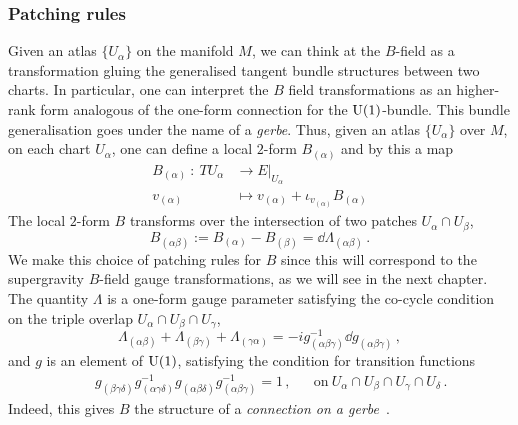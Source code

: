 \documentclass[debug]{phd}
\begin{document}
					\subsubsection{Patching rules}
						Given an atlas $\{U_\alpha\}$ on the manifold $M$, we can think at the $B$-field as a transformation gluing the generalised tangent bundle structures between two charts.
						In particular, one can interpret the $B$ field transformations as an higher-rank form analogous of the one-form connection for the $\mathrm{U}(1)$-bundle.
						This bundle generalisation goes under the name of a \emph{gerbe}.
						Thus, given an atlas $\{U_\alpha \}$ over $M$, on each chart $U_\alpha$, one can define a local $2$-form $B_{(\alpha)}$ and by this a map
								\begin{equation}\label{Bmap}
									\begin{array}{rl}
										B_{(\alpha)}\ :\ TU_\alpha & \longrightarrow E\vert_{U_{\alpha}} \\
										 v_{(\alpha)} & \longmapsto v_{(\alpha)} + \iota_{v_{(\alpha)}} B_{(\alpha)}
									\end{array}
								\end{equation}
						The local $2$-form $B$ transforms over the intersection of two patches $U_\alpha \cap U_\beta$, 
								\begin{equation}\label{Btrans}
									B_{(\alpha\beta)}:= B_{(\alpha)} - B_{(\beta)} = \dd \Lambda_{(\alpha \beta)}\, .
								\end{equation}
						We make this choice of patching rules for $B$ since this will correspond to the supergravity $B$-field gauge transformations, as we will see in the next chapter.
						The quantity $\Lambda$ is a one-form gauge parameter satisfying the co-cycle condition on the triple overlap $U_\alpha \cap U_\beta \cap U_\gamma$,
								\begin{equation}\label{cycliccond}
									\Lambda_{(\alpha\beta)} + \Lambda_{(\beta\gamma)} + \Lambda_{(\gamma\alpha)} = - i g^{-1}_{(\alpha\beta\gamma)} \dd g_{(\alpha\beta\gamma)}\, ,
								\end{equation}
						and $g$ is an element of $\mathrm{U}(1)$, satisfying the condition for transition functions
								\begin{align}
									& & g_{(\beta\gamma\delta)} g^{-1}_{(\alpha\gamma\delta)} g_{(\alpha\beta\delta)} g^{-1}_{(\alpha\beta\gamma)} = 1\, , & & \mbox{on}\ U_\alpha \cap U_\beta \cap U_\gamma \cap U_\delta\, .	
								\end{align}
						Indeed, this gives $B$ the structure of a \emph{connection on a gerbe}~\cite{HitchinLagrangian}.
						
\end{document}
